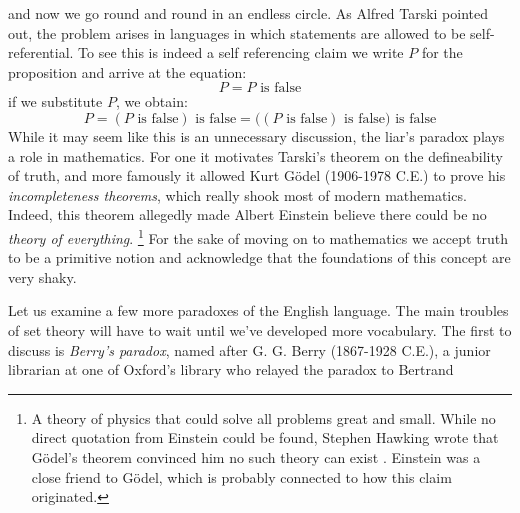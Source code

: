         {%
            \label{eqn:That_Statement_Is_False}%
        }
        and now we go round and round in an endless circle. As Alfred Tarski
        pointed out, the problem arises in languages in which statements are
        allowed to be self-referential. To see this is indeed a self
        referencing claim we write $P$ for the proposition and arrive at the
        equation:
        \begin{equation}
            P=P\text{ is false}
        \end{equation}
        if we substitute $P$, we obtain:
        \begin{equation}
            P=(P\text{ is false})\text{ is false}
             =\big((P\text{ is false})\text{ is false}\big)\text{ is false}
        \end{equation}
        While it may seem like this is an unnecessary discussion, the liar's
        paradox plays a role in mathematics. For one it motivates Tarski's
        theorem on the defineability of truth, and more famously it allowed Kurt
        G\"{o}del (1906-1978 C.E.) to prove his
        \textit{incompleteness theorems}, which really shook most of modern
        mathematics. Indeed, this theorem allegedly made Albert
        Einstein believe there could be no
        \textit{theory of everything}.%
        \footnote{%
            A theory of physics that could solve all problems great and small.
            While no direct quotation from Einstein could be found, Stephen
            Hawking wrote that G\"{o}del's theorem convinced him no such theory
            can exist \cite{hawking2002godel}. Einstein was a close friend to
            G\"{o}del, which is probably connected to how this claim originated.
        }
        For the sake of moving on to mathematics we accept truth to be a
        primitive notion and acknowledge that the foundations of this concept
        are very shaky.
        \par\hfill\par
        Let us examine a few more paradoxes of the English language. The main
        troubles of set theory will have to wait until we've developed more
        vocabulary. The first to discuss is
        \textit{Berry's paradox},
        named after G. G. Berry (1867-1928 C.E.), a junior
        librarian at one of Oxford's library who relayed the paradox to Bertrand

